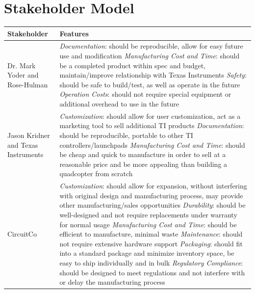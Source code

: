 \documentclass[a4paper,10pt]{scrartcl}
\begin{document}
\newpage
\section{Stakeholder Model}
\begin{center}
\begin{tabular}{| l | p{7.5cm} |}
\hline
\textbf{Stakeholder} & \textbf{Features}\\
\hline
Dr. Mark Yoder and Rose-Hulman & \emph{Documentation}: should be reproducible,
allow for easy future use and modification\newline
\emph{Manufacturing Cost and Time}: should be a completed product within spec
and budget, maintain/improve relationship with Texas Instruments\newline
\emph{Safety}: should be safe to build/test, as well as operate in the
future\newline
\emph{Operation Costs}: should not require special equipment or additional
overhead to use in the future\\
\hline
Jason Kridner and Texas Instruments & \emph{Customization}: should allow for
user customization, act as a marketing tool to sell additional TI products
\emph{Documentation}: should be reproducible, portable to other TI
controllers/launchpads\newline
\emph{Manufacturing Cost and Time}: should be cheap and quick to manufacture in
order to sell at a reasonable price and be more appealing than building a
quadcopter from scratch\\
\hline
CircuitCo & \emph{Customization}: should allow for expansion, without
interfering with original design and manufacturing process, may provide other
manufacturing/sales opportunities\newline
\emph{Durability}: should be well-designed and not require replacements under
warranty for normal usage\newline
\emph{Manufacturing Cost and Time}: should be efficient to manufacture, minimal
waste\newline
\emph{Maintenance}: should not require extensive hardware support\newline
\emph{Packaging}: should fit into a standard package and minimize inventory
space, be easy to ship individually and in bulk\newline
\emph{Regulatory Compliance}: should be designed to meet regulations and not
interfere with or delay the manufacturing process\\
\hline
\end{tabular}
\end{center}
\end{document}
